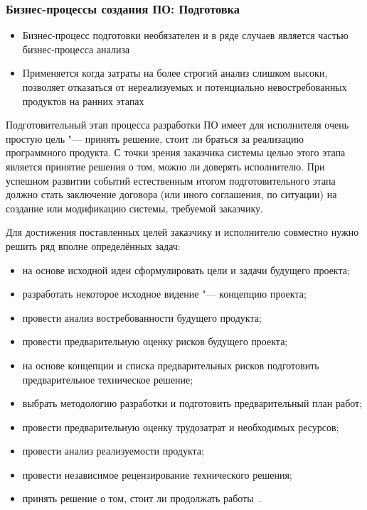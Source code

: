 \documentclass{../industrial-development}
\begin{document}
\begin{frame} \frametitle{Бизнес-процессы создания ПО: Подготовка}
	\begin{itemize}
		\item Бизнес-процесс подготовки необязателен и в ряде случаев является частью бизнес-процесса анализа
		\item Применяется когда затраты на более строгий анализ слишком высоки, позволяет отказаться от нереализуемых и потенциально невостребованных продуктов на ранних этапах
	\end{itemize}
\end{frame}

\lecturenotes

Подготовительный этап процесса разработки ПО имеет для исполнителя очень простую цель "--- принять решение, стоит ли браться за реализацию программного продукта. С точки зрения заказчика системы целью этого этапа является принятие решения о том, можно ли доверять исполнителю. При успешном развитии событий естественным итогом подготовительного этапа должно стать заключение договора (или иного соглашения, по ситуации) на создание или модификацию системы, требуемой заказчику.

Для достижения поставленных целей заказчику и исполнителю совместно нужно решить ряд вполне определённых задач:
\begin{itemize}
	\item на основе исходной идеи сформулировать цели и задачи будущего проекта;
	\item разработать некоторое исходное видение "--- концепцию проекта;
	\item провести анализ востребованности будущего продукта;
	\item провести предварительную оценку рисков будущего проекта;
	\item на основе концепции и списка предварительных рисков подготовить предварительное техническое решение;
	\item выбрать методологию разработки и подготовить предварительный план работ;
	\item провести предварительную оценку трудозатрат и необходимых ресурсов;
	\item провести анализ реализуемости продукта;
	\item провести независимое рецензирование технического решения;
	\item принять решение о том, стоит ли продолжать работы~\cite{Habr1}.
\end{itemize}
\end{document}
